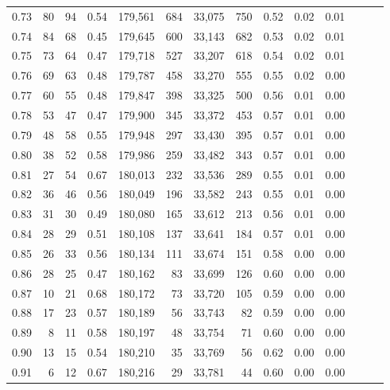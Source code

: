 \begin{tabular}{rrrrrrrrrrrrrr}
0.73 &     80 &     94 &  0.54 &  179,561 &      684 &  33,075 &     750 &  0.52 &  0.02 &      0.01 \\
0.74 &     84 &     68 &  0.45 &  179,645 &      600 &  33,143 &     682 &  0.53 &  0.02 &      0.01 \\
0.75 &     73 &     64 &  0.47 &  179,718 &      527 &  33,207 &     618 &  0.54 &  0.02 &      0.01 \\
0.76 &     69 &     63 &  0.48 &  179,787 &      458 &  33,270 &     555 &  0.55 &  0.02 &      0.00 \\
0.77 &     60 &     55 &  0.48 &  179,847 &      398 &  33,325 &     500 &  0.56 &  0.01 &      0.00 \\
0.78 &     53 &     47 &  0.47 &  179,900 &      345 &  33,372 &     453 &  0.57 &  0.01 &      0.00 \\
0.79 &     48 &     58 &  0.55 &  179,948 &      297 &  33,430 &     395 &  0.57 &  0.01 &      0.00 \\
0.80 &     38 &     52 &  0.58 &  179,986 &      259 &  33,482 &     343 &  0.57 &  0.01 &      0.00 \\
0.81 &     27 &     54 &  0.67 &  180,013 &      232 &  33,536 &     289 &  0.55 &  0.01 &      0.00 \\
0.82 &     36 &     46 &  0.56 &  180,049 &      196 &  33,582 &     243 &  0.55 &  0.01 &      0.00 \\
0.83 &     31 &     30 &  0.49 &  180,080 &      165 &  33,612 &     213 &  0.56 &  0.01 &      0.00 \\
0.84 &     28 &     29 &  0.51 &  180,108 &      137 &  33,641 &     184 &  0.57 &  0.01 &      0.00 \\
0.85 &     26 &     33 &  0.56 &  180,134 &      111 &  33,674 &     151 &  0.58 &  0.00 &      0.00 \\
0.86 &     28 &     25 &  0.47 &  180,162 &       83 &  33,699 &     126 &  0.60 &  0.00 &      0.00 \\
0.87 &     10 &     21 &  0.68 &  180,172 &       73 &  33,720 &     105 &  0.59 &  0.00 &      0.00 \\
0.88 &     17 &     23 &  0.57 &  180,189 &       56 &  33,743 &      82 &  0.59 &  0.00 &      0.00 \\
0.89 &      8 &     11 &  0.58 &  180,197 &       48 &  33,754 &      71 &  0.60 &  0.00 &      0.00 \\
0.90 &     13 &     15 &  0.54 &  180,210 &       35 &  33,769 &      56 &  0.62 &  0.00 &      0.00 \\
0.91 &      6 &     12 &  0.67 &  180,216 &       29 &  33,781 &      44 &  0.60 &  0.00 &      0.00 \\

\end{tabular}
